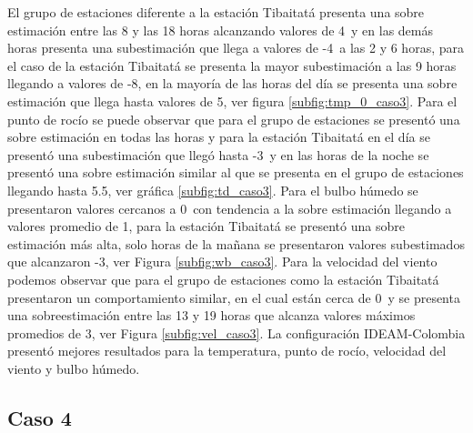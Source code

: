 El grupo de estaciones diferente a la estación Tibaitatá presenta una sobre estimación entre las 8 y las 18 horas alcanzando valores de 4\celc\ y en las demás horas presenta una subestimación que llega a valores de -4\celc\ a las 2 y 6 horas, para el caso de la estación Tibaitatá se presenta la mayor subestimación a las 9 horas llegando a valores de -8\celc, en la mayoría de las horas del día se presenta una sobre estimación que llega hasta valores de 5\celc, ver figura \ref{subfig:tmp_0_caso3}. Para el punto de rocío se puede observar que para el grupo de estaciones se presentó una sobre estimación en todas las horas y para la estación Tibaitatá en el día se presentó una subestimación que llegó hasta -3\celc\ y en las horas de la noche se presentó una sobre estimación similar al que se presenta en el grupo de estaciones llegando hasta 5.5\celc, ver gráfica \ref{subfig:td_caso3}. Para el bulbo húmedo se presentaron valores cercanos a 0\celc\ con tendencia a la sobre estimación llegando a valores promedio de 1\celc, para la estación Tibaitatá se presentó una sobre estimación más alta, solo  horas de la mañana se presentaron valores subestimados que alcanzaron -3\celc, ver Figura \ref{subfig:wb_caso3}. Para la velocidad del viento podemos observar que para el grupo de estaciones como la estación Tibaitatá presentaron un comportamiento similar, en el cual están cerca de 0\celc\ y se presenta una sobreestimación entre las 13 y 19 horas que alcanza valores máximos promedios de 3\celc, ver Figura \ref{subfig:vel_caso3}. La configuración IDEAM-Colombia presentó mejores resultados para la temperatura, punto de rocío, velocidad del viento y bulbo húmedo.\\





\subsection{Caso 4}

